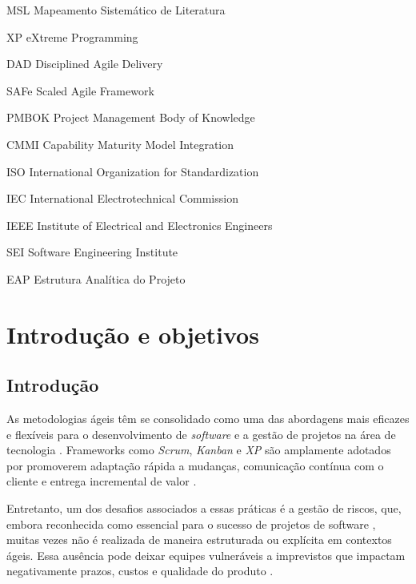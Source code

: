 \documentclass[
	12pt,
	openright,
	twoside,
	a4paper,
	english,
	brazil
	]{abntex2}
\begin{document}

\begin{siglas}
  \item[MSL] Mapeamento Sistemático de Literatura
  \item[XP] eXtreme Programming
  \item[DAD] Disciplined Agile Delivery 
  \item[SAFe] Scaled Agile Framework
  \item[PMBOK] Project Management Body of Knowledge
  \item[CMMI] Capability Maturity Model Integration
  \item[ISO] International Organization for Standardization
  \item[IEC] International Electrotechnical Commission
  \item[IEEE] Institute of Electrical and Electronics Engineers
  \item[SEI] Software Engineering Institute
  \item[EAP] Estrutura Analítica do Projeto
\end{siglas}


\tableofcontents*
\cleardoublepage
\textual


\chapter{Introdução e objetivos} %

\section{Introdução}

As metodologias ágeis têm se consolidado como uma das abordagens mais eficazes e flexíveis para o desenvolvimento de \textit{software} e a gestão de projetos na área de tecnologia \cite{AgileManifest, AgileGuide}. Frameworks como \textit{Scrum}, \textit{Kanban} e \textit{XP} são amplamente adotados por promoverem adaptação rápida a mudanças, comunicação contínua com o cliente e entrega incremental de valor \cite{Poppendieck_Poppendieck_2003, Pressman_2014}.

Entretanto, um dos desafios associados a essas práticas é a gestão de riscos, que, embora reconhecida como essencial para o sucesso de projetos de software \cite{PMBOK, iso16085}, muitas vezes não é realizada de maneira estruturada ou explícita em contextos ágeis. Essa ausência pode deixar equipes vulneráveis a imprevistos que impactam negativamente prazos, custos e qualidade do produto \cite{Afshari, Zahedi}.
\end{document}

